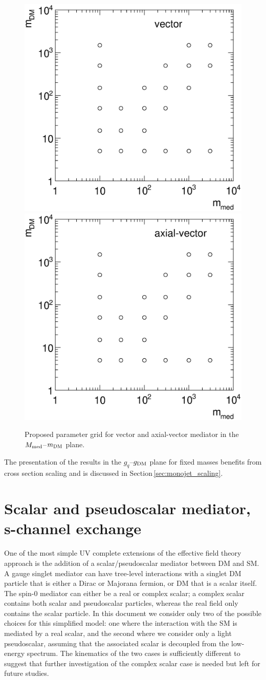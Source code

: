\begin{figure}
\centering
\includegraphics[width=0.45\linewidth]{figures/monojet/grid_V.eps}
\includegraphics[width=0.45\linewidth]{figures/monojet/grid_A.eps}
\caption{Proposed parameter grid for vector and axial-vector mediator in the $M_{\rm{med}}$--$m_{\rm{DM}}$ plane.}
\label{fig:monojet_grid_V}
\end{figure}

The presentation of the results in the $g_q$--$g_{\rm{DM}}$ plane for fixed masses benefits from cross section scaling and is discussed in Section\,\ref{sec:monojet_scaling}.






\section{Scalar and pseudoscalar mediator, s-channel exchange}
\label{sec:monojet_scalar}

One of the most simple UV complete extensions of the effective field theory approach is the addition of a scalar/pseudoscalar mediator between DM and SM.
A gauge singlet mediator can have tree-level interactions with a singlet DM particle that is either a Dirac or Majorana fermion, or DM that is a scalar itself. The spin-$0$ mediator can either be a real or complex scalar; a complex scalar contains both scalar and pseudoscalar particles, whereas the real field only contains the scalar particle.
In this document we consider only two of the possible choices for this simplified model: one where the interaction with the SM is mediated by a real scalar, and the second where we consider only a light pseudoscalar, assuming that the associated scalar is decoupled from the low-energy spectrum. The kinematics of the two cases is sufficiently different to suggest that further investigation of the complex scalar case is needed but left for future studies. 

